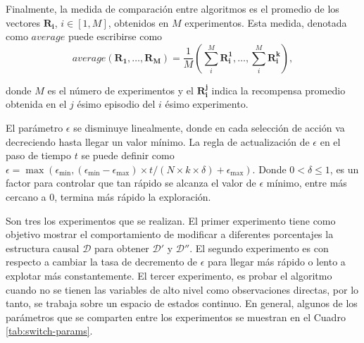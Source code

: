 Finalmente, la medida de comparación entre algoritmos es
el promedio de los vectores $\mathbf{R_i}$, $i\in [1, M]$,  obtenidos en $M$ experimentos. Esta medida, denotada como  $average$ puede escribirse como 
\begin{equation}
\label{eq:average}
average(\mathbf{R_1}, \dots, \mathbf{R_M}) = \frac{1}{M}(\sum^M_i \mathbf{R_{i}^1}, \dots, \sum^M_i\mathbf{R_{i}^k}),    
\end{equation}

donde $M$ es el número de experimentos y el $\mathbf{R_i^j}$ indica la recompensa promedio obtenida en el $j$ ésimo episodio del $i$ ésimo experimento.

El parámetro $\epsilon$ se disminuye linealmente, donde
en cada selección de acción va decreciendo hasta llegar
un valor mínimo. La regla de actualización de $\epsilon$ en
el paso de tiempo $t$ se puede definir como $\epsilon = \max(\epsilon_{\min}, (\epsilon_{\min} - \epsilon_{\max}) \times t/ (N \times k \times \delta) + \epsilon_{\max})$. Donde $0 < \delta \leq 1$, es un factor para controlar
que tan rápido se alcanza el valor de $\epsilon$  mínimo, entre más cercano a 0,
termina más rápido la exploración.

Son tres los experimentos que se realizan. El primer experimento tiene 
como objetivo mostrar el comportamiento de modificar a
diferentes porcentajes la estructura causal $\mathcal{D}$ para obtener $\mathcal{D'}$ y $\mathcal{D}''$. El segundo experimento es con respecto a cambiar la tasa de decremento
de $\epsilon$ para llegar más rápido o lento a explotar 
más constantemente. El tercer experimento, es probar
el algoritmo cuando no se tienen las variables
de alto nivel como observaciones directas, por lo tanto,
se trabaja sobre un espacio de estados continuo. En general,
algunos de los parámetros que se comparten entre los experimentos se muestran en el Cuadro \ref{tab:switch-params}.

